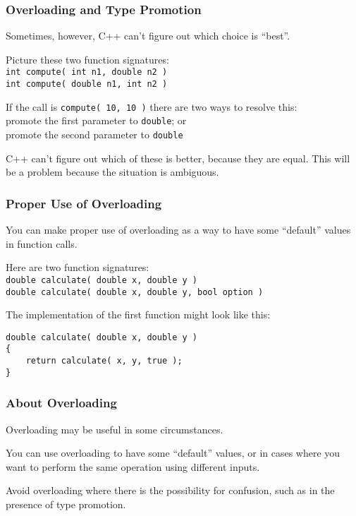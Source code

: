 \begin{frame}
\frametitle{Overloading and Type Promotion}
Sometimes, however, C++ can't figure out which choice is ``best''.

Picture these two function signatures:\\
\texttt{int compute( int n1, double n2 )}\\
\texttt{int compute( double n1, int n2 )}

If the call is \texttt{compute( 10, 10 )} there are two ways to resolve this:\\
\quad promote the first parameter to \texttt{double}; or\\
\quad promote the second parameter to \texttt{double}

C++ can't figure out which of these is better, because they are equal. This will be a problem because the situation is ambiguous.

\end{frame}

\begin{frame}[fragile]
\frametitle{Proper Use of Overloading}
You can make proper use of overloading as a way to have some ``default'' values in function calls.

Here are two function signatures:\\
\texttt{double calculate( double x, double y )}\\
\texttt{double calculate( double x, double y, bool option )}

The implementation of the first function might look like this:
\begin{verbatim}
double calculate( double x, double y )
{
    return calculate( x, y, true );
}
\end{verbatim}
\end{frame}


\begin{frame}
\frametitle{About Overloading}

Overloading may be useful in some circumstances.

You can use overloading to have some ``default'' values, or in cases where you want to perform the same operation using different inputs.

Avoid overloading where there is the possibility for confusion, such as in the presence of type promotion.

\end{frame}




